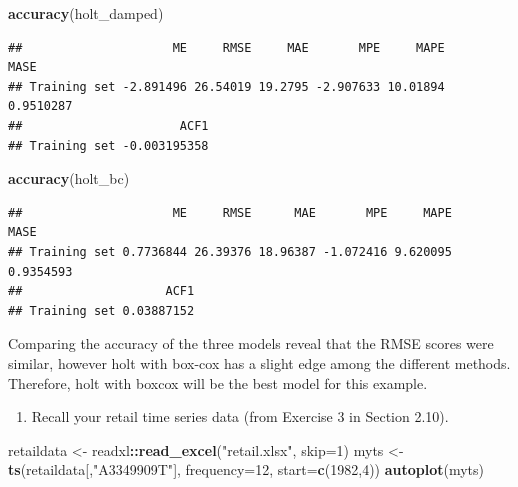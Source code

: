 \documentclass[]{article}
\newenvironment{Shaded}{\begin{snugshade}}{\end{snugshade}}
\newcommand{\KeywordTok}[1]{\textcolor[rgb]{0.13,0.29,0.53}{\textbf{#1}}}
\newcommand{\DataTypeTok}[1]{\textcolor[rgb]{0.13,0.29,0.53}{#1}}
\newcommand{\DecValTok}[1]{\textcolor[rgb]{0.00,0.00,0.81}{#1}}
\newcommand{\StringTok}[1]{\textcolor[rgb]{0.31,0.60,0.02}{#1}}
\newcommand{\OperatorTok}[1]{\textcolor[rgb]{0.81,0.36,0.00}{\textbf{#1}}}
\newcommand{\NormalTok}[1]{#1}
\providecommand{\tightlist}{%
  \setlength{\itemsep}{0pt}\setlength{\parskip}{0pt}}
\begin{document}
\begin{Shaded}
\begin{Highlighting}[]
\KeywordTok{accuracy}\NormalTok{(holt_damped)}
\end{Highlighting}
\end{Shaded}

\begin{verbatim}
##                     ME     RMSE     MAE       MPE     MAPE      MASE
## Training set -2.891496 26.54019 19.2795 -2.907633 10.01894 0.9510287
##                      ACF1
## Training set -0.003195358
\end{verbatim}

\begin{Shaded}
\begin{Highlighting}[]
\KeywordTok{accuracy}\NormalTok{(holt_bc)}
\end{Highlighting}
\end{Shaded}

\begin{verbatim}
##                     ME     RMSE      MAE       MPE     MAPE      MASE
## Training set 0.7736844 26.39376 18.96387 -1.072416 9.620095 0.9354593
##                    ACF1
## Training set 0.03887152
\end{verbatim}

Comparing the accuracy of the three models reveal that the RMSE scores
were similar, however holt with box-cox has a slight edge among the
different methods. Therefore, holt with boxcox will be the best model
for this example.

\begin{enumerate}
\def\labelenumi{\arabic{enumi}.}
\setcounter{enumi}{7}
\tightlist
\item
  Recall your retail time series data (from Exercise 3 in Section 2.10).
\end{enumerate}

\begin{Shaded}
\begin{Highlighting}[]
\NormalTok{retaildata <-}\StringTok{ }\NormalTok{readxl}\OperatorTok{::}\KeywordTok{read_excel}\NormalTok{(}\StringTok{"retail.xlsx"}\NormalTok{, }\DataTypeTok{skip=}\DecValTok{1}\NormalTok{)}
\NormalTok{myts <-}\StringTok{ }\KeywordTok{ts}\NormalTok{(retaildata[,}\StringTok{"A3349909T"}\NormalTok{], }\DataTypeTok{frequency=}\DecValTok{12}\NormalTok{, }\DataTypeTok{start=}\KeywordTok{c}\NormalTok{(}\DecValTok{1982}\NormalTok{,}\DecValTok{4}\NormalTok{))}
\KeywordTok{autoplot}\NormalTok{(myts)}
\end{Highlighting}
\end{Shaded}
\end{document}
